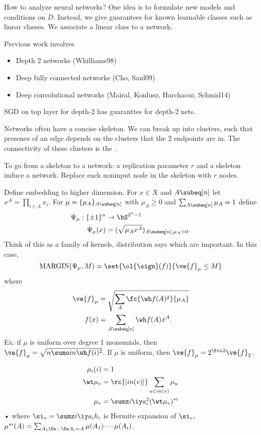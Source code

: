  How to analyze neural networks? One idea is to formulate new models and conditions on $D$. Instead, we give guarantees for known learnable classes such as linear classes.
 We associate a linear class to a network.
 
Previous work involves
\begin{itemize}
\item
Depth 2 networks (Whilliams98)
\item
Deep fully connected networks (Cho, Saul09)
\item
Deep convolutional networks (Mairal, Konlusz, Harchaoui, Schmid14)
\end{itemize}
SGD on top layer for depth-2 has guaranttes for depth-2 nets. 

Networks often have a concise skeleton. %
We can break up into clusters, such that presence of an edge depends on the clusters that the 2 endpoints are in. The connectivity of these clusters is the .

To go from a skeleton to a network: a replication parameter $r$ and a skeleton induce a network. Replace each noninput node in the skeleton with $r$ nodes.

Define embedding to higher dimension. For $x\in X$ and $A\subeq [n]$ let $x^A = \prod_{i\in A} x_i$. For $\mu=\{\mu_A\}_{A\subeq [n]}$ with $\mu_A\ge 0$ and $\sum_{A\subeq [n]}\mu_A=1$ define
\begin{align}
\Psi_\mu:\{\pm 1\}^n&\to \bS^{2^n-1}\\
\Psi_\mu(x) &= (\sqrt{\mu_A x^A})_{A\subeq [n],\mu_A>0}.
\end{align}
Think of this as a family of kernels, distribution says which are important.
In this case,
$$
\text{MARGIN}(\Psi_\mu, M) = \set{\ol{\sign}(f)}{\ve{f}_\mu \le M}
$$
where
\begin{align}
\ve{f}_\mu &= \sqrt{\sum_A \fc{\wh f(A)^2}{\mu_A}}\\
f(x) &=\sum_{A\subeq [n]} \wh f(A)x^A.
\end{align}
Ex. if $\mu$ is uniform over degree 1 monomials, then $\ve{f}_\mu = \sqrt{n\sumo in \wh f(i)^2}$. If $\mu$ is uniform, then $\ve{f}_\mu = 2^{\fc n2}\ve{f}_2$.

\begin{align}
\mu_i(i) &=1\\
\wt \mu_v &=\rc{|in(v)|}\sum_{u\in in(v)}\mu_u\\
\mu_v &= \sumz i\iy a_i^2(\wt \mu_v)^{*i}
\end{align}•
where $\si_v=\sumz i\iy a_i h_i $ is Hermite expansion of $\si_v$, $\mu^{*i}(A) =\sum_{A_1\De\cdots \De A_i=A} \mu(A_1)\cdots \mu(A_i)$.

